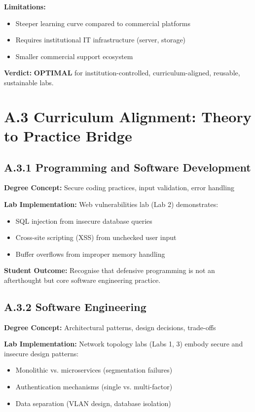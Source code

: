 \textbf{Limitations:}
\begin{itemize}
    \item Steeper learning curve compared to commercial platforms
    \item Requires institutional IT infrastructure (server, storage)
    \item Smaller commercial support ecosystem
\end{itemize}


\textbf{Verdict:} \textbf{OPTIMAL} for institution-controlled, curriculum-aligned, reusable, sustainable labs.


\section*{A.3 Curriculum Alignment: Theory to Practice Bridge}


\subsection*{A.3.1 Programming and Software Development}


\textbf{Degree Concept:} Secure coding practices, input validation, error handling

\textbf{Lab Implementation:} Web vulnerabilities lab (Lab 2) demonstrates:
\begin{itemize}
    \item SQL injection from insecure database queries
    \item Cross-site scripting (XSS) from unchecked user input
    \item Buffer overflows from improper memory handling
\end{itemize}

\textbf{Student Outcome:} Recognise that defensive programming is not an afterthought but core software engineering practice.


\subsection*{A.3.2 Software Engineering}


\textbf{Degree Concept:} Architectural patterns, design decisions, trade-offs

\textbf{Lab Implementation:} Network topology labs (Labs 1, 3) embody secure and insecure design patterns:
\begin{itemize}
    \item Monolithic vs. microservices (segmentation failures)
    \item Authentication mechanisms (single vs. multi-factor)
    \item Data separation (VLAN design, database isolation)
\end{itemize}

